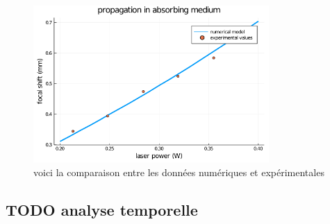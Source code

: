 \begin{figure}
\centering
\includegraphics[width=0.8\textwidth]{./files/grinlensplots_model.png}
\caption{
voici la comparaison entre les données numériques et expérimentales
}
\end{figure}


\subsection{TODO analyse temporelle}
